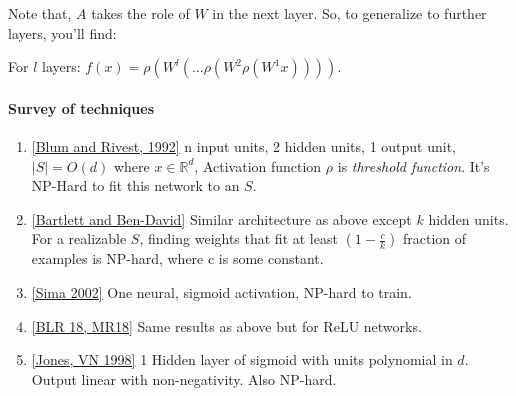 Note that, $A$ takes the role of $W$ in the next layer. So, to generalize to further layers, you'll find:

For $l$ layers: $f(x) = \rho(W^l(...\rho(W^2\rho(W^1x))))$.

\paragraph{Survey of techniques}
\begin{enumerate}
	\item \hyperlink{https://people.csail.mit.edu/rivest/pubs/BR93.pdf}{[Blum and Rivest, 1992]} n input units, 2 hidden units, 1 output unit, $|S|=O(d)$ where $x\in\mathbb{R}^d$, Activation function $\rho$ is \textit{threshold function}. It's NP-Hard to fit this network to an $S$.
	\item \hyperlink{https://ac.els-cdn.com/S0304397501000573/1-s2.0-S0304397501000573-main.pdf?_tid=e2ae69f9-606c-4b53-a085-e8919afbe4f1&acdnat=1548162465_310e08a262614701ef11c40c8999c1c6}{[Bartlett and Ben-David]} Similar architecture as above except $k$ hidden units. For a realizable $S$, finding weights that fit at least $(1 - \frac{c}{k})$ fraction of examples is NP-hard, where c is some constant.
	\item \hyperlink{https://www.mitpressjournals.org/doi/pdf/10.1162/089976602760408035}{[Sima 2002]} One neural, sigmoid activation, NP-hard to train.
	\item \hyperlink{}{[BLR 18, MR18]} Same results as above but for ReLU networks.
	\item \hyperlink{}{[Jones, VN 1998]} 1 Hidden layer of sigmoid with units polynomial in $d$. Output linear with non-negativity. Also NP-hard.
	
\end{enumerate}